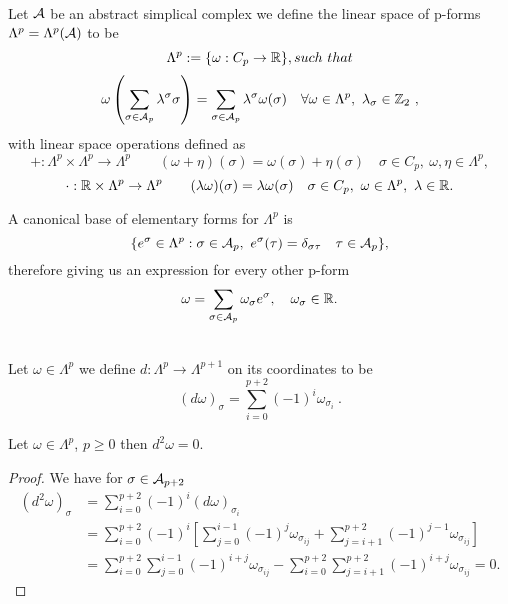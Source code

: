 \documentclass[../1.tex]{subfiles}
\begin{document}
    \begin{defn}
        \\
        Let $\mathcal{A}$ be an abstract simplical complex we define the linear space of p-forms $\Lambda^p = \Lambda^p(\mathcal{A})$ to be 
        \[ \Lambda^p := \{ \omega : C_p \to \R\}, such \ that\]
        \[ \omega \left( \sum_{\sigma \in \mc{A}_p} \lambda^\sigma \sigma \right) = \sum_{\sigma \in \mc{A}_p} \lambda^\sigma \omega(\sigma)
        \quad \forall \omega \in \Lambda^p , \ \lambda_\sigma \in \Z_2 \ ,\]
        with linear space operations defined as
        \[ + : \Lambda^p \times \Lambda^p \to \Lambda^p \quad
        \quad (\omega + \eta)(\sigma) = \omega(\sigma) + \eta(\sigma) \quad \sigma \in C_p,\ \omega,\eta \in \Lambda^p, \]
        \[ \cdot : \mathbb{R} \times \Lambda^p \to \Lambda^p \quad
        \quad (\lambda \omega)(\sigma) = \lambda \omega(\sigma) \quad \sigma \in C_p,\ \omega \in \Lambda^p,\ \lambda \in \mathbb{R}. \]
    \end{defn} 
    \begin{prop}
        A canonical base of elementary forms for $\Lambda^p$ is
        \[ \{e^\sigma \in \Lambda^p : \sigma \in \mathcal{A}_p,\ e^\sigma(\tau) = \delta_{\sigma \tau} \quad \tau \in \mathcal{A}_p\},\]
        therefore giving us an expression for every other p-form
        \[ \omega = \sum_{\sigma \in \mathcal{A}_p} \omega_\sigma e^\sigma, \quad \omega_\sigma \in \mathbb{R}. \]
    \end{prop}
    \begin{defn}
        \\
        Let $\omega \in \Lambda^p$ we define $d : \Lambda^p \to \Lambda^{p+1}$ on its coordinates to be 
        \[ (d \omega)_\sigma = \sum_{i = 0}^{p+2} (-1)^i \omega_{\sigma_i} \ . \]
    \end{defn}
    \begin{lem}
        Let $\omega \in \Lambda^p$, $p \geq 0$ then $d^2 \omega = 0$.
    \end{lem}
    \begin{proof}
        We have for $\sigma \in \mathcal{A}_{p+2}$\\
        \begin{equation*}
            \begin{aligned}
                (d^2 \omega)_\sigma &= \sum_{i = 0}^{p+2} (-1)^i (d \omega)_{\sigma_i} \\
                &= \sum_{i = 0}^{p+2} (-1)^i \left[ \sum_{j = 0}^{i-1}(-1)^j \omega_{\sigma_{ij}} + 
                \sum_{j = i+1}^{p+2} (-1)^{j-1} \omega_{\sigma_{ij}} \right]\\
                &= \sum_{i = 0}^{p+2} \sum_{j = 0}^{i-1} (-1)^{i+j} \omega_{\sigma_{ij}} -
                \sum_{i = 0}^{p+2} \sum_{j = i+1}^{p+2} (-1)^{i+j} \omega_{\sigma_{ij}} = 0.
            \end{aligned}
        \end{equation*}
    \end{proof}
\end{document}
